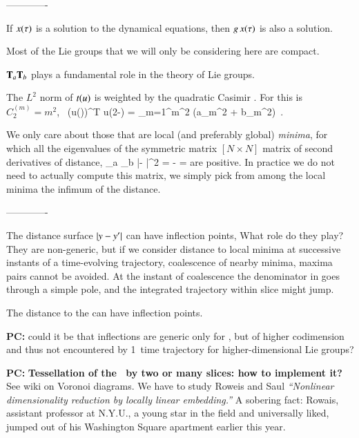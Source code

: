 -------------

If $x(\tau)$ is a solution to the dynamical equations, then
$g\,x(\tau)$ is also a solution.

Most of the Lie groups that we will only be considering here are
compact.

$\mathbf{T}_a \mathbf{T}_b$ plays a fundamental role in the theory of Lie groups.

The $L^2$ norm of $t(u)$ is weighted by
the quadratic Casimir . For  this is
$C_2^{(m)} = m^2$,
\beq
\oint {}
     \, (\Lg u(\gSpace))^T \Lg u(2\pi-\gSpace)
= \sum_{m=1}^\infty m^2 \left(a_m^2 + b_m^2\right)
\,.

We only care about those that are local (and preferably global) {\em
minima}, for which all the eigenvalues of the symmetric matrix
$[N\!\times\!N]$ matrix of second derivatives of distance,
\beq
{}
     {\partial \gSpace_a \partial \gSpace_b}
        |\sspRed - \slicep|^2
    =
  - =
are positive. In practice we do not need to actually compute
this matrix, we simply pick from among the local minima
the infimum of the distance.


-------------

The distance surface $|y - {y'}|$ can have inflection points,
What role do they play? They are non-generic, but if we consider distance
to local minima at successive instants of a time-evolving trajectory,
coalescence of
nearby minima, maxima pairs cannot be avoided. At the instant of
coalescence the denominator in  goes through a simple
pole, and the integrated trajectory within slice might jump.

The distance to the {\template} can have inflection points.

{\bf PC:}{ could it be that inflections are generic only for ,
        but of higher codimension and thus not encountered
        by 1\dmn\ time trajectory for higher-dimensional Lie groups?}

{\bf PC:}{
{\bf Tessellation of the \reducedsp\ by two or many slices:
how to implement it?}
See 
{wiki on Voronoi diagrams}.
We have to study Roweis  and Saul
\emph{``Nonlinear dimensionality reduction by locally linear embedding.''}
A sobering fact: Rowais, assistant professor at N.Y.U., a young
star in the field and universally liked, jumped out of his Washington
Square apartment earlier this year.
	}


